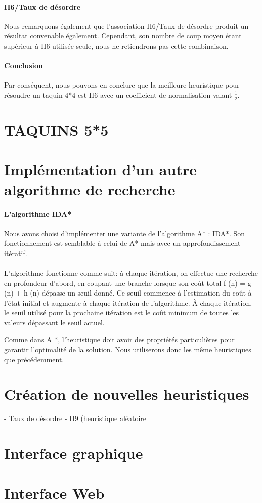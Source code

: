 \documentclass[10pt,a4paper]{report}
\begin{document}
\paragraph{H6/Taux de désordre}{Nous remarquons également que l'association H6/Taux de désordre produit un résultat convenable également. Cependant, son nombre de coup moyen étant supérieur à H6 utilisée seule, nous ne retiendrons pas cette combinaison.}
\paragraph{Conclusion}{Par conséquent, nous pouvons en conclure que la meilleure heuristique pour résoudre un taquin 4*4 est H6 avec un coefficient de normalisation valant $\frac{1}{2}$.}
\section{TAQUINS 5*5}
\section{Implémentation d'un autre algorithme de recherche}
\paragraph{L'algorithme IDA*}{Nous avons choisi d'implémenter une variante de l'algorithme A* : IDA*. Son fonctionnement est semblable à celui de A* mais avec un approfondissement itératif.}
\paragraph{}{L'algorithme fonctionne comme suit: à chaque itération, on effectue une recherche en profondeur d'abord, en coupant une branche lorsque son coût total
f (n) = g (n) + h (n) dépasse un seuil donné. Ce seuil commence à l'estimation du coût à l'état initial et augmente à chaque itération de l'algorithme. À chaque itération, le seuil utilisé pour la prochaine itération est le coût minimum de toutes les valeurs dépassant le seuil actuel.

Comme dans A *, l'heuristique doit avoir des propriétés particulières pour garantir l'optimalité de la solution. Nous utiliserons donc les même heuristiques que précédemment.}

\section{Création de nouvelles heuristiques}
- Taux de désordre
- H9 (heuristique aléatoire
\section{Interface graphique}
\section{Interface Web}
\end{document}
